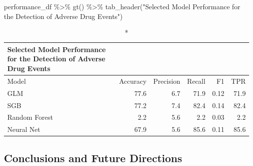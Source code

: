 \documentclass[preprint, 3p,
authoryear]{elsarticle} %
\newenvironment{Shaded}{\begin{snugshade}}{\end{snugshade}}
\newcommand{\FunctionTok}[1]{\textcolor[rgb]{0.00,0.00,0.00}{#1}}
\newcommand{\NormalTok}[1]{#1}
\newcommand{\SpecialCharTok}[1]{\textcolor[rgb]{0.00,0.00,0.00}{#1}}
\newcommand{\StringTok}[1]{\textcolor[rgb]{0.31,0.60,0.02}{#1}}
\begin{document}
\begin{Shaded}
\begin{Highlighting}[]
\NormalTok{performance\_df }\SpecialCharTok{\%\textgreater{}\%}
  \FunctionTok{gt}\NormalTok{() }\SpecialCharTok{\%\textgreater{}\%}
  \FunctionTok{tab\_header}\NormalTok{(}\StringTok{"Selected Model Performance for the Detection of Adverse Drug Events"}\NormalTok{)}
\end{Highlighting}
\end{Shaded}

\captionsetup[table]{labelformat=empty,skip=1pt}
\begin{longtable}{lrrrrr}
\caption*{
{\large Selected Model Performance for the Detection of Adverse Drug Events}
} \\ 
\toprule
Model & Accuracy & Precision & Recall & F1 & TPR \\ 
\midrule
GLM & 77.6 & 6.7 & 71.9 & 0.12 & 71.9 \\ 
SGB & 77.2 & 7.4 & 82.4 & 0.14 & 82.4 \\ 
Random Forest & 2.2 & 5.6 & 2.2 & 0.03 & 2.2 \\ 
Neural Net & 67.9 & 5.6 & 85.6 & 0.11 & 85.6 \\ 
\bottomrule
\end{longtable}

\hypertarget{conclusions-and-future-directions}{%
\subsection{Conclusions and Future
Directions}\label{conclusions-and-future-directions}}


\end{document}
